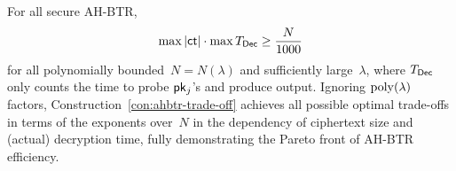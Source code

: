 \begin{corollary}\label{cor:lower-bound}
For all secure AH-BTR,
\begin{align*}
\max{|\ct|}\cdot\max{T_\Dec}\geq\frac{N}{1000}
\end{align*}
for all polynomially bounded~${N=N(\lambda)}$ and sufficiently large~$\lambda$,
where $T_\Dec$ only counts the time to probe $\pk_j$'s and produce output.
Ignoring $\operatorname{poly}(\lambda)$ factors,
Construction~\ref{con:ahbtr-trade-off} achieves all possible optimal trade-offs
in terms of the exponents over~$N$ in the dependency of ciphertext size and (actual) decryption time,
fully demonstrating the Pareto front of AH-BTR efficiency.
\end{corollary}
